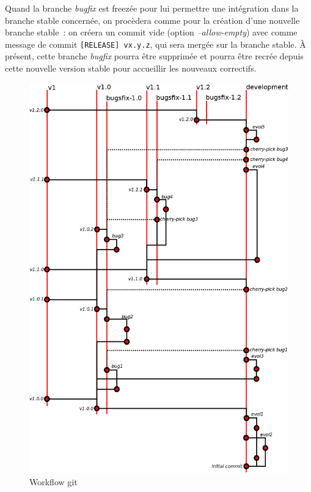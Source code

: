 \begin{description}
		Quand la branche \emph{bugfix} est freezée pour lui permettre une intégration dans la branche stable concernée, on procèdera comme pour la création d'une nouvelle branche stable~: on créera un commit vide (option \emph{--allow-empty}) avec comme message de commit {\tt[RELEASE] vx.y.z}, qui sera mergée sur la branche stable.
		À présent, cette branche \emph{bugfix} pourra être supprimée et pourra être recrée depuis cette nouvelle version stable pour accueillir les nouveaux correctifs.
\end{description}

\begin{figure}
	\centering
	\includegraphics[scale=0.3]{part/developpement/code/fig_workflow_git.png}
	\caption{Workflow git}
	\label{fig_3.2_git}
\end{figure}
